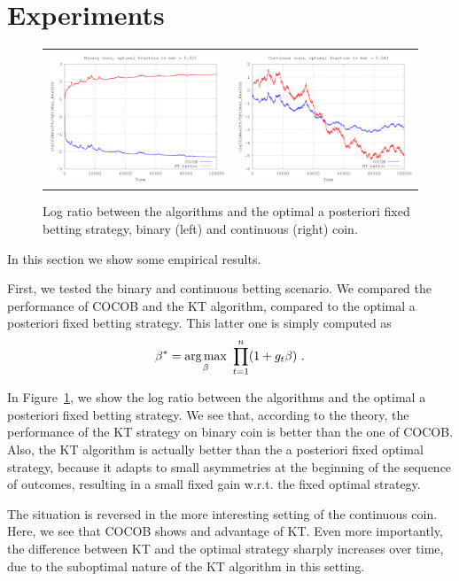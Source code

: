 \section{Experiments}
\label{sec:exp}

\begin{figure}[t]
\begin{tabular}{cc}
\includegraphics[width=0.45\linewidth]{code/binary_coin.png} &
\includegraphics[width=0.45\linewidth]{code/continuos_coin.png}
\end{tabular}
\caption{Log ratio between the algorithms and the optimal a posteriori fixed betting strategy, binary (left) and continuous (right) coin.}
\label{fig:bin_cont_coin}
\end{figure}

In this section we show some empirical results.

First, we tested the binary and continuous betting scenario. We compared the performance of \ac{COCOB} and the \ac{KT} algorithm, compared to the optimal a posteriori fixed betting strategy. This latter one is simply computed as
\[
\beta^*=\operatorname*{arg\,max}_{\beta} \ \prod_{t=1}^n (1+g_t \beta)~.
\]

In Figure~\ref{fig:bin_cont_coin}, we show the log ratio between the algorithms and the optimal a posteriori fixed betting strategy. We see that, according to the theory, the performance of the \ac{KT} strategy on binary coin is better than the one of \ac{COCOB}. Also, the \ac{KT} algorithm is actually better than the a posteriori fixed optimal strategy, because it adapts to small asymmetries at the beginning of the sequence of outcomes, resulting in a small fixed gain w.r.t. the fixed optimal strategy.

The situation is reversed in the more interesting setting of the continuous coin. Here, we see that \ac{COCOB} shows and advantage of \ac{KT}. Even more importantly, the difference between \ac{KT} and the optimal strategy sharply increases over time, due to the suboptimal nature of the \ac{KT} algorithm in this setting.